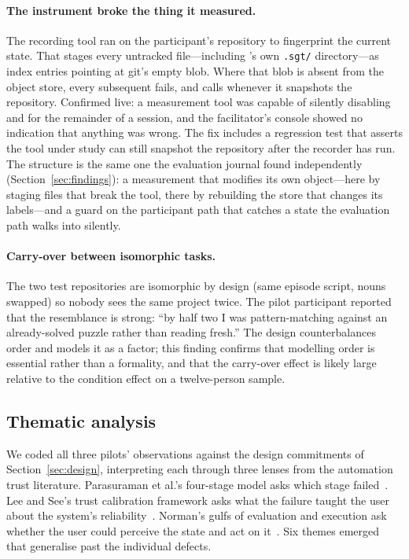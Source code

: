 \paragraph{The instrument broke the thing it measured.}
The recording tool ran  on the participant's
repository to fingerprint the current state. That stages every untracked file---including
\sgt{}'s own \texttt{.sgt/} directory---as index entries pointing at git's empty
blob. Where that blob is absent from the object store, every subsequent
 fails, and \sgt{} calls  whenever it
snapshots the repository. Confirmed live: a measurement tool was capable of
silently disabling  and  for the remainder of a
session, and the facilitator's console showed no indication that anything was
wrong. The fix includes a regression test that asserts the tool under study can
still snapshot the repository after the recorder has run. The structure is the
same one the evaluation journal found independently
(Section~\ref{sec:findings}): a measurement that modifies its own
object---here by staging files that break the tool, there by rebuilding the store
that changes its labels---and a guard on the participant path that catches a
state the evaluation path walks into silently.

\paragraph{Carry-over between isomorphic tasks.}
The two test repositories are isomorphic by design (same episode script, nouns
swapped) so nobody sees the same project twice. The pilot participant reported
that the resemblance is strong: ``by half two I was pattern-matching against an
already-solved puzzle rather than reading fresh.'' The design counterbalances
order and models it as a factor; this finding confirms that modelling order is
essential rather than a formality, and that the carry-over effect is likely large
relative to the condition effect on a twelve-person sample.

\subsection{Thematic analysis}
\label{sec:pilot-lessons}

We coded all three pilots' observations against the design commitments of
Section~\ref{sec:design}, interpreting each through three lenses from the
automation trust literature. Parasuraman et al.'s four-stage model asks which
stage failed~\cite{parasuraman2000}. Lee and See's trust calibration framework
asks what the failure taught the user about the system's
reliability~\cite{lee2004}. Norman's gulfs of evaluation and execution ask
whether the user could perceive the state and act on
it~\cite{norman1986}. Six themes emerged that generalise past the individual defects.

